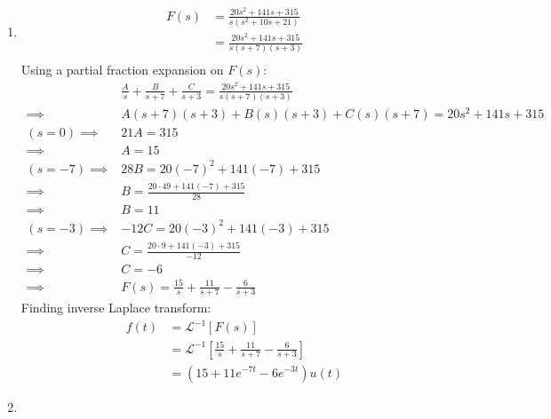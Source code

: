 \begin{enumerate}
	\item{
		\begin{align*}
		F(s) &= \frac{20s^2 + 141s + 315}{s(s^2+10s+21)}\\
		&= \frac{20s^2 + 141s + 315}{s(s+7)(s+3)}\\
		\end{align*}
		Using a partial fraction expansion on $F(s)$:
		\begin{align*}
		&\frac{A}{s} + \frac{B}{s+7} + \frac{C}{s+3} = 
		\frac{20s^2 + 141s + 315}{s(s+7)(s+3)}\\
		\implies &A(s+7)(s+3) + B(s)(s+3) + C(s)(s+7) = 
		20s^2 + 141s + 315\\
		(s = 0) \implies &21A = 315\\
		\implies &A = 15\\
		(s = -7) \implies &28B = 20(-7)^2 + 141(-7) + 315\\
		\implies &B = \frac{20\cdot 49 + 141(-7) + 315}{28}\\
		\implies &B = 11\\
		(s = -3) \implies &-12C =   20(-3)^2 + 141(-3) + 315\\
		\implies &C = \frac{20\cdot 9 + 141(-3) + 315}{-12}\\
		\implies &C = -6\\
		\implies &F(s) = \frac{15}{s} + \frac{11}{s+7} - 
		\frac{6}{s+3}
		\end{align*}
		Finding inverse Laplace transform:
		\begin{align*}
		f(t) &= \mathcal{L}^{-1}[F(s)]\\
		&= \mathcal{L}^{-1}[\frac{15}{s} + \frac{11}{s+7} - 
		\frac{6}{s+3}]\\
		&= (15 + 11e^{-7t}-6e^{-3t})u(t)
		\end{align*}
	}
	\item{
		
}
\end{enumerate}

